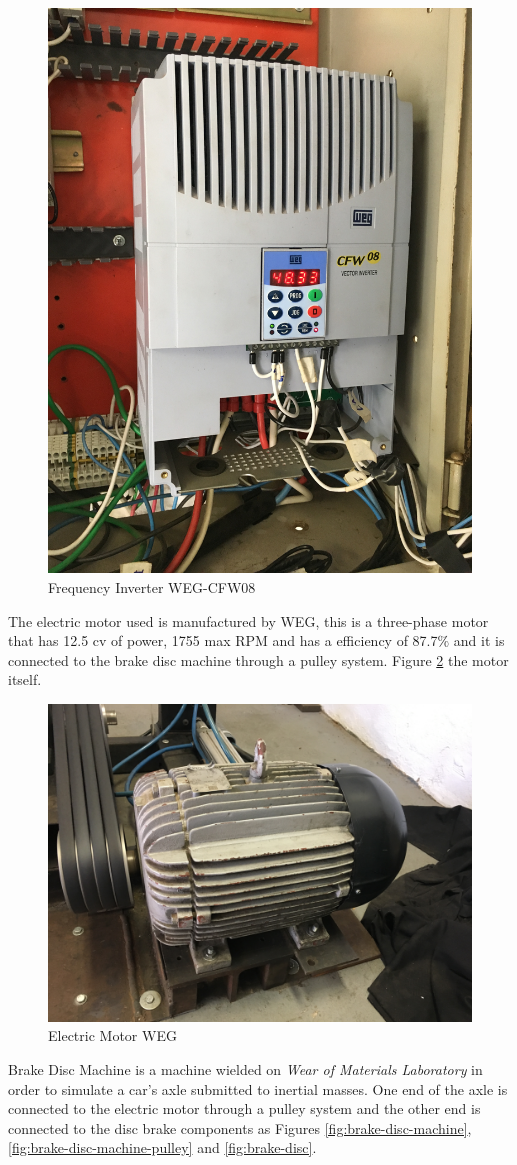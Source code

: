 		\begin{figure}[htbp]
			\centering
			\includegraphics[width=.5\textwidth, angle=270]{figuras/fig-frequency-inverter}
			\caption{Frequency Inverter WEG-CFW08}
			\label{fig:frequency-inverter}
		\end{figure}
		\par

		The electric motor used is manufactured by WEG, this is a three-phase motor that has 12.5 cv of power, 1755 max RPM and has a efficiency of 87.7$\%$ and it is connected to the brake disc machine through a pulley system. Figure \ref{fig:electric-motor} the motor itself.

		\begin{figure}[htbp]
			\centering
			\includegraphics[width=.5\textwidth]{figuras/fig-electric-motor}
			\caption{Electric Motor WEG}
			\label{fig:electric-motor}
		\end{figure}
		\par

		Brake Disc Machine is a machine wielded on \textit{Wear of Materials Laboratory} in order to simulate a car's axle submitted to inertial masses. One end of the axle is connected to the electric motor through a pulley system and the other end is connected to the disc brake components as Figures \ref{fig:brake-disc-machine}, \ref{fig:brake-disc-machine-pulley} and \ref{fig:brake-disc}.

